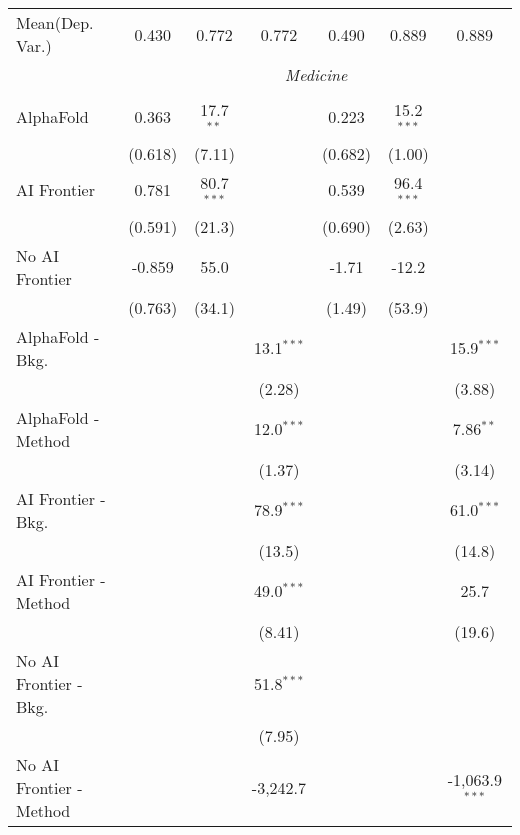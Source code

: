 \begin{tabular}{lcccccc}
Mean(Dep. Var.) & 0.430 & 0.772 & 0.772 & 0.490 & 0.889 & 0.889 \\
 & \multicolumn{6}{c}{\textit{Medicine}} \\ \\
   AlphaFold               & 0.363   & 17.7$^{**}$  &              & 0.223   & 15.2$^{***}$ &   \\   
                           & (0.618) & (7.11)       &              & (0.682) & (1.00)       &   \\   
   AI Frontier             & 0.781   & 80.7$^{***}$ &              & 0.539   & 96.4$^{***}$ &   \\   
                           & (0.591) & (21.3)       &              & (0.690) & (2.63)       &   \\   
   No AI Frontier          & -0.859  & 55.0         &              & -1.71   & -12.2        &   \\   
                           & (0.763) & (34.1)       &              & (1.49)  & (53.9)       &   \\   
   AlphaFold - Bkg.        &         &              & 13.1$^{***}$ &         &              & 15.9$^{***}$\\   
                           &         &              & (2.28)       &         &              & (3.88)\\   
   AlphaFold - Method      &         &              & 12.0$^{***}$ &         &              & 7.86$^{**}$\\   
                           &         &              & (1.37)       &         &              & (3.14)\\   
   AI Frontier - Bkg.      &         &              & 78.9$^{***}$ &         &              & 61.0$^{***}$\\   
                           &         &              & (13.5)       &         &              & (14.8)\\   
   AI Frontier - Method    &         &              & 49.0$^{***}$ &         &              & 25.7\\   
                           &         &              & (8.41)       &         &              & (19.6)\\   
   No AI Frontier - Bkg.   &         &              & 51.8$^{***}$ &         &              &   \\   
                           &         &              & (7.95)       &         &              &   \\   
   No AI Frontier - Method &         &              & -3,242.7     &         &              & -1,063.9$^{***}$\\   

\end{tabular}
